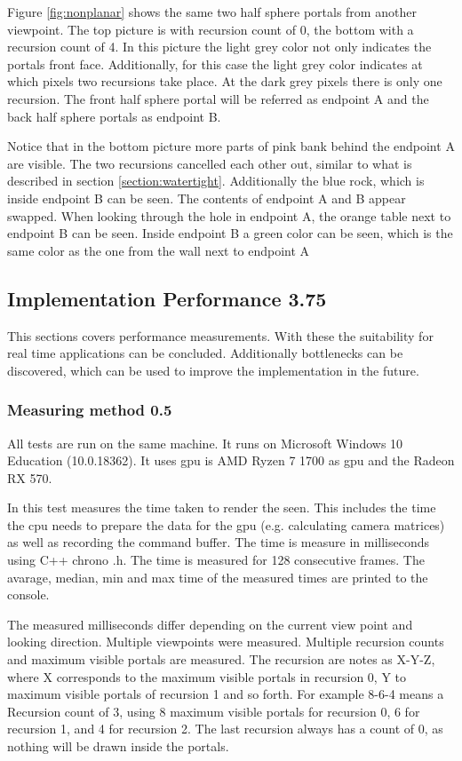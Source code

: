 Figure \ref{fig:nonplanar} shows the same two half sphere portals from another viewpoint. The top picture is with recursion count of 0, the bottom with a recursion count of 4. In this picture the light grey color not only indicates the portals front face. Additionally, for this case the light grey color indicates at which pixels two recursions take place. At the dark grey pixels there is only one recursion. The front half sphere portal will be referred as \gls{endpoint} A and the back half sphere portals as \gls{endpoint} B.

Notice that in the bottom picture more parts of pink bank behind the \gls{endpoint} A are visible. The two recursions cancelled each other out, similar to what is described in section \ref{section:watertight}. Additionally the blue rock, which is inside \gls{endpoint} B can be seen. The contents of \gls{endpoint} A and B appear swapped. When looking through the hole in \gls{endpoint} A, the orange table next to \gls{endpoint} B can be seen. Inside \gls{endpoint} B a green color can be seen, which is the same color as the one from the wall next to \gls{endpoint} A

\subsection{Implementation Performance 3.75}

This sections covers performance measurements. With these the suitability for real time applications can be concluded. Additionally bottlenecks can be discovered, which can be used to improve the implementation in the future.

\subsubsection{Measuring method 0.5}
All tests are run on the same machine. It runs on Microsoft Windows 10 Education (10.0.18362). It uses \gls{gpu} is AMD Ryzen 7 1700 as \gls{gpu} and the Radeon RX 570.

In this test measures the time taken to render the seen. This includes the time the \gls{cpu} needs to prepare the data for the \gls{gpu} (e.g. calculating camera matrices) as well as recording the command buffer. The time is measure in milliseconds using C++ chrono .h. The time is measured for 128 consecutive frames. The avarage, median, min and max time of the measured times are printed to the console.


The measured milliseconds differ depending on the current view point and looking direction. Multiple viewpoints were measured. Multiple recursion counts and maximum visible portals are measured. The recursion are notes as X-Y-Z, where X corresponds to the maximum visible portals in recursion 0, Y to maximum visible portals of recursion 1 and so forth. For example 8-6-4 means a Recursion count of 3, using 8 maximum visible portals for recursion 0, 6 for recursion 1, and 4 for recursion 2. The last recursion always has a count of 0, as nothing will be drawn inside the portals. 

